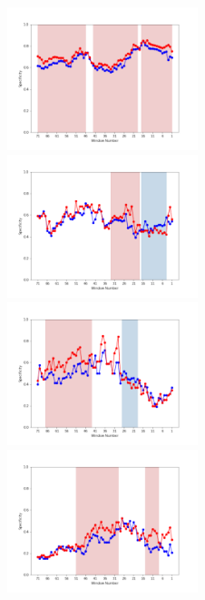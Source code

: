 \documentclass[11pt]{jreport}
\begin{document}
\begin{figure}[H]
\begin{minipage}{\textwidth}
\vspace{0.08\textheight}
\begin{center}
    \includegraphics[width=0.495\textwidth]{Uenaka_fig/RQ2_result/Nova_review_Specificity.pdf}
    \includegraphics[width=0.495\textwidth]{Uenaka_fig/RQ2_result/Neutron_review_Specificity.pdf}
    \includegraphics[width=0.495\textwidth]{Uenaka_fig/RQ2_result/Cinder_review_Specificity.pdf}
    \includegraphics[width=0.495\textwidth]{Uenaka_fig/RQ2_result/Keystone_review_Specificity.pdf}

\end{center}
\end{minipage}
\end{figure}
\end{document}
